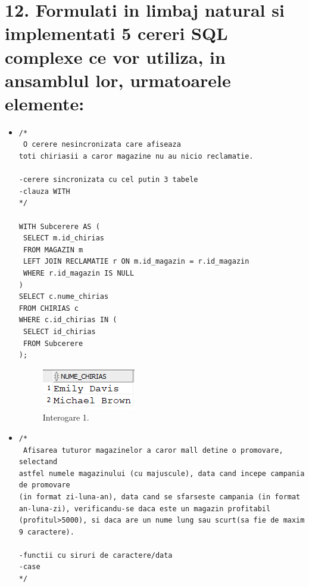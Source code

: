 
\section*{12. Formulati in limbaj natural si implementati 5 cereri SQL complexe ce vor utiliza, in ansamblul lor, urmatoarele elemente:}

\vspace{0.5cm}
\begin{itemize}
    \item 
    \begin{lstlisting}
/*
 O cerere nesincronizata care afiseaza
toti chiriasii a caror magazine nu au nicio reclamatie.

-cerere sincronizata cu cel putin 3 tabele
-clauza WITH
*/

WITH Subcerere AS (
 SELECT m.id_chirias
 FROM MAGAZIN m
 LEFT JOIN RECLAMATIE r ON m.id_magazin = r.id_magazin
 WHERE r.id_magazin IS NULL
)
SELECT c.nume_chirias
FROM CHIRIAS c
WHERE c.id_chirias IN (
 SELECT id_chirias
 FROM Subcerere
);
    \end{lstlisting}
    \vspace{0.2cm}
    \begin{figure}[h]
      \centerline{\includegraphics{images/interogare1.png}}
      \caption{ Interogare 1.}
    \end{figure}
    \vspace{0.5cm}

    \item 
    \begin{lstlisting}
/*
 Afisarea tuturor magazinelor a caror mall detine o promovare, selectand
astfel numele magazinului (cu majuscule), data cand incepe campania de promovare
(in format zi-luna-an), data cand se sfarseste campania (in format an-luna-zi), verificandu-se daca este un magazin profitabil (profitul>5000), si daca are un nume lung sau scurt(sa fie de maxim 9 caractere).

-functii cu siruri de caractere/data
-case
*/


\end{lstlisting}
\end{itemize}

